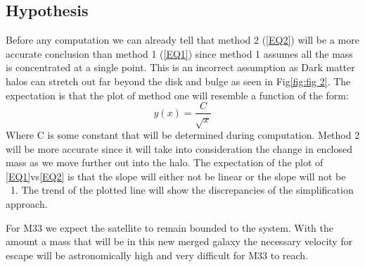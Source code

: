 \documentclass[fleqn,usenatbib]{mnras}
\begin{document}
\subsection{Hypothesis}
\label{sec:Hypothesis}
Before any computation we can already tell that method 2 (\ref{EQ2}) will be a more accurate conclusion than method 1 (\ref{EQ1}) since method 1 assumes all the mass is concentrated at a single point. This is an incorrect assumption as Dark matter halos can stretch out far beyond the disk and bulge as seen in Fig\ref{fig:fig 2}. The expectation is that the plot of method one will resemble a function of the form:
\begin{equation}
    y(x) = \frac{C}{\sqrt{x}}
    \label{EQ4}
\end{equation}
Where C is some constant that will be determined during computation. Method 2 will be more accurate since it will take into consideration the change in enclosed mass as we move further out into the halo. 
The expectation of the plot of \ref{EQ1}vs\ref{EQ2} is that the slope will either not be linear or the slope will not be ~1. The trend of the plotted line will show the discrepancies of the simplification approach.

For M33 we expect the satellite to remain bounded to the system. With the amount a mass that will be in this new merged galaxy the necessary velocity for escape will be astronomically high and very difficult for M33 to reach. 








\bsp	%
\label{lastpage}
\end{document}
